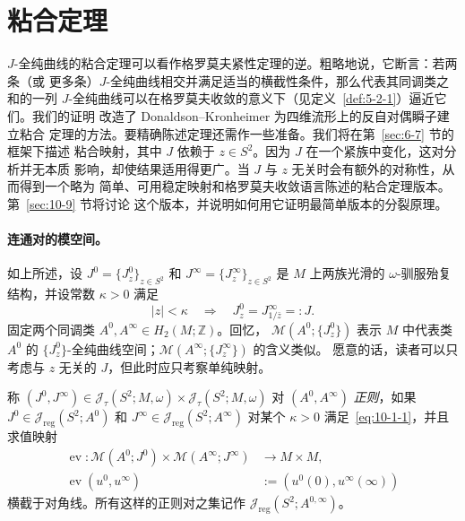 \section{粘合定理}\label{sec:10-1}

$J$-全纯曲线的粘合定理可以看作格罗莫夫紧性定理的逆。粗略地说，它断言：若两条（或
更多条）$J$-全纯曲线相交并满足适当的横截性条件，那么代表其同调类之和的一列
$J$-全纯曲线可以在格罗莫夫收敛的意义下（见定义~\ref{def:5-2-1}）逼近它们。我们的证明
改造了 Donaldson--Kronheimer  为四维流形上的反自对偶瞬子建立粘合
定理的方法。要精确陈述定理还需作一些准备。我们将在第~\ref{sec:6-7} 节的框架下描述
粘合映射，其中 $J$ 依赖于 $z\in S^2$。因为 $J$ 在一个紧族中变化，这对分析并无本质
影响，却使结果适用得更广。当 $J$ 与 $z$ 无关时会有额外的对称性，从而得到一个略为
简单、可用稳定映射和格罗莫夫收敛语言陈述的粘合定理版本。第~\ref{sec:10-9} 节将讨论
这个版本，并说明如何用它证明最简单版本的分裂原理。

\paragraph{连通对的模空间。}
如上所述，设
$J^0=\{J_z^0\}_{z\in S^2}$ 和 $J^\infty=\{J_z^\infty\}_{z\in S^2}$
是 $M$ 上两族光滑的 $\omega$-驯服殆复结构，并设常数 $\kappa>0$ 满足
\begin{equation}\label{eq:10-1-1}
  |z|<\kappa
  \quad\Longrightarrow\quad
  J_z^0=J_{1/\bar z}^{\infty}=:J.
\end{equation}
固定两个同调类 $A^0,A^\infty\in H_2(M;\mathbb Z)$。回忆，
$\mathcal M(A^0;\{J_z^0\})$ 表示 $M$ 中代表类 $A^0$ 的
$\{J_z^0\}$-全纯曲线空间；$\mathcal M(A^\infty;\{J_z^\infty\})$ 的含义类似。
愿意的话，读者可以只考虑与 $z$ 无关的 $J$，但此时应只考察单纯映射。

\begin{definition}\label{def:10-1-1}
称
$(J^0,J^\infty)\in\mathcal J_\tau(S^2;M,\omega)\times
\mathcal J_\tau(S^2;M,\omega)$ 对 $(A^0,A^\infty)$ \emph{正则}，如果
$J^0\in\mathcal J_{\mathrm{reg}}(S^2;A^0)$ 和
$J^\infty\in\mathcal J_{\mathrm{reg}}(S^2;A^\infty)$ 对某个 $\kappa>0$
满足~\eqref{eq:10-1-1}，并且求值映射
\begin{equation}\label{eq:10-1-2}
  \begin{aligned}
  \operatorname{ev}:\mathcal M(A^0;J^0)\times\mathcal M(A^\infty;J^\infty)
  &\longrightarrow M\times M,\\
  \operatorname{ev}(u^0,u^\infty)&:=(u^0(0),u^\infty(\infty))
  \end{aligned}
\end{equation}
横截于对角线。所有这样的正则对之集记作
$\mathcal J_{\mathrm{reg}}(S^2;A^{0,\infty})$。
\end{definition}

